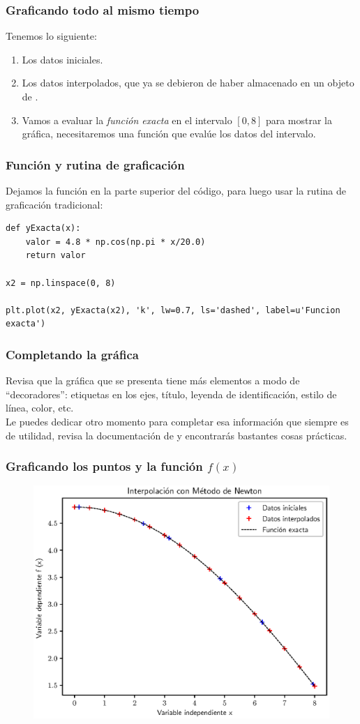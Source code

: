 \documentclass[12pt]{beamer}
\begin{document}
\begin{frame}
\frametitle{Graficando todo al mismo tiempo}
Tenemos lo siguiente:
\begin{enumerate}[<+->]
\item Los datos iniciales.
\item Los datos interpolados, que ya se debieron de haber almacenado en un objeto de \python.
\item Vamos a evaluar la \textit{función exacta} en el intervalo $[0, 8]$ para mostrar la gráfica, necesitaremos una función que evalúe los datos del intervalo.
\end{enumerate}
\end{frame}
\begin{frame}
\frametitle{Función y rutina de graficación}
Dejamos la función en la parte superior del código, para luego usar la rutina de graficación tradicional:
\begin{lstlisting}[caption=Graficando la función exacta]
def yExacta(x):
    valor = 4.8 * np.cos(np.pi * x/20.0)
    return valor

x2 = np.linspace(0, 8)

plt.plot(x2, yExacta(x2), 'k', lw=0.7, ls='dashed', label=u'Funcion exacta')
\end{lstlisting}
\end{frame}
\begin{frame}
\frametitle{Completando la gráfica}
Revisa que la gráfica que se presenta tiene más elementos a modo de \enquote{decoradores}: \pause etiquetas en los ejes, título, leyenda de identificación, estilo de línea, color, etc.
\\
\bigskip
\pause
Le puedes dedicar otro momento para completar esa información que siempre es de utilidad, revisa la documentación de  y encontrarás bastantes cosas prácticas.
\end{frame}
\begin{frame}
\frametitle{Graficando los puntos y la función $f (x)$}
\begin{figure}
    \centering
    \includegraphics[scale=0.58]{Imagenes/Ejercicio_Newton_03.eps}
\end{figure}
\end{frame}
\end{document}
